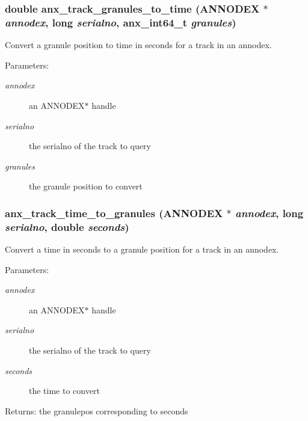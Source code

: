 \subsubsection{\setlength{\rightskip}{0pt plus 5cm}double anx\_\-track\_\-granules\_\-to\_\-time ({\bf ANNODEX} $\ast$ {\em annodex}, long {\em serialno}, {\bf anx\_\-int64\_\-t} {\em granules})}\label{anx__track_8h_a5}


Convert a granule position to time in seconds for a track in an annodex. 

\begin{Desc}
\item[Parameters:]
\begin{description}
\item[{\em annodex}]an ANNODEX$\ast$ handle \item[{\em serialno}]the serialno of the track to query \item[{\em granules}]the granule position to convert \end{description}
\end{Desc}
\subsubsection{ anx\_\-track\_\-time\_\-to\_\-granules ({\bf ANNODEX} $\ast$ {\em annodex}, long {\em serialno}, double {\em seconds})}\label{anx__track_8h_a4}


Convert a time in seconds to a granule position for a track in an annodex. 

\begin{Desc}
\item[Parameters:]
\begin{description}
\item[{\em annodex}]an ANNODEX$\ast$ handle \item[{\em serialno}]the serialno of the track to query \item[{\em seconds}]the time to convert \end{description}
\end{Desc}
\begin{Desc}
\item[Returns:]the granulepos corresponding to seconds \end{Desc}
